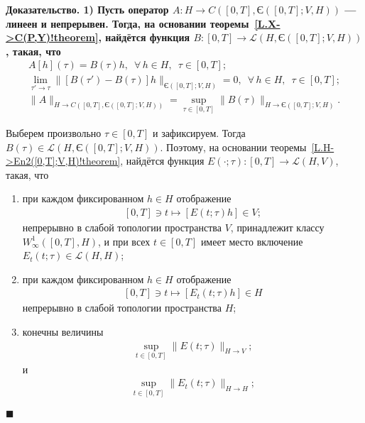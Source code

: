 \documentclass{report}
\newcounter{rem}[section]
\renewcommand{\theenumi}{\arabic{enumi}}
\renewcommand{\labelenumi}{\theenumi)}
\newcounter{theor}[section]
\newenvironment{Proof}{\par\noindent\bf Доказательство.\rm}{ $\blacksquare$\par}
\begin{document}
\begin{Proof}
1) Пусть оператор $A:H\to C([0,T],\textrm{Є}([0,T];V,H))$ --- линеен и непрерывен. Тогда, на основании теоремы~\ref{L.X->C(P,Y)!theorem}, найдётся функция $B:[0,T]\to\mathcal{L}(H,\textrm{Є}([0,T];V,H))$, такая, что
\begin{gather}
\label{L.H->C([0,T],En2([0,T];V,H))!A.representation1}
A[h](\tau)=B(\tau)h,\,\,\,\forall\,h\in H,\,\,\,\tau\in[0,T];\\
\label{L.H->C([0,T],En2([0,T];V,H))!B.continuity}
\lim\limits_{\tau'\to\tau}\|[B(\tau')-B(\tau)]h\|_{\textrm{Є}([0,T];V,H)}=0,\,\,\,\forall\,h\in H,\,\,\,\tau\in[0,T];\\
\label{L.H->C([0,T],En2([0,T];V,H))!A.norm1}
\|A\|_{H\to C([0,T],\textrm{Є}([0,T];V,H))}=\sup\limits_{\tau\in[0,T]}\|B(\tau)\|_{H\to\textrm{Є}([0,T];V,H)}.
\end{gather}

Выберем произвольно $\tau\in[0,T]$ и зафиксируем. Тогда $B(\tau)\in \mathcal{L}(H,\textrm{Є}([0,T];V,H))$. Поэтому, на основании теоремы~\ref{L.H->En2([0,T];V,H)!theorem}, найдётся функция $E(\cdot;\tau):[0,T]\to\mathcal{L}(H,V)$, такая, что


{
\renewcommand{\theenumi}{\asbuk{enumi}}
\renewcommand{\labelenumi}{\theenumi)}
\begin{enumerate}
\item  при каждом фиксированном $h\in H$ отображение
\begin{gather}\label{L.H->C([0,T],En2([0,T];V,H))!t->E(t;tau)h}
[0,T]\ni t\mapsto[E(t;\tau)h]\in V;
\end{gather}
непрерывно в слабой топологии пространства $V$, принадлежит классу  $W^1_\infty([0,T],H)$,  и при всех $t\in[0,T]$ имеет место включение  $E_t(t;\tau)\in\mathcal{L}(H,H)$;

\item при каждом фиксированном $h\in H$ отображение
\begin{gather}\label{L.H->C([0,T],En2([0,T];V,H))!t->E.t(t;tau)h}
[0,T]\ni t\mapsto[E_t(t;\tau)h]\in H
\end{gather}
непрерывно в слабой топологии пространства $H$;

\item конечны величины
\begin{gather}\label{L.H->C([0,T],En2([0,T];V,H))!sup.wrt.t.of.norm(E(t;tau))}
\sup\limits_{t\in[0,T]}\|E(t;\tau)\|_{H\to V};
\end{gather}
и
\begin{gather}\label{L.H->C([0,T],En2([0,T];V,H))!sup.wrt.t.of.norm(E.t(t;tau))}
\sup\limits_{t\in[0,T]}\|E_t(t;\tau)\|_{H\to H};
\end{gather}


\end{enumerate}}
\end{Proof}
\end{document}
